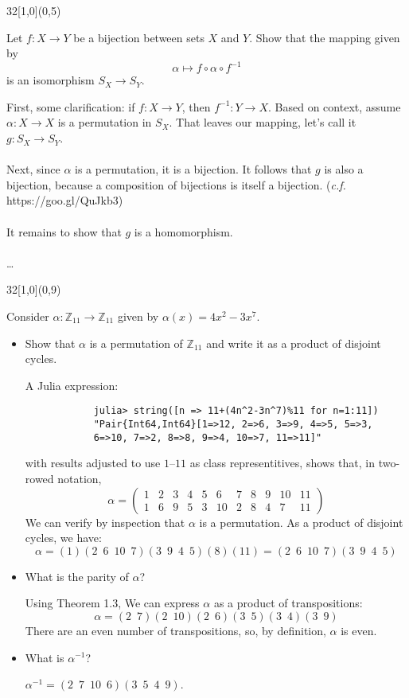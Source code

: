 \documentclass[12pt]{article}
\newcommand{\zee}{\mathbb{Z}}
\newenvironment{exercise}[2]{\begin{textblock}{32}[1,0](0,#2)\noindent#1\end{textblock}}{\vspace{1in}}
\begin{document}
\begin{exercise}{1.39}{5}
	{\noindent}Let $f : X\to Y$ be a bijection between sets $X$ and $Y$. Show that the mapping given by \[\alpha \mapsto f\circ\alpha\circ f^{-1}\] is an isomorphism $S_X\to S_Y$.
	\bigskip

	{\noindent}First, some clarification: if $f:X\to Y$, then $f^{-1}:Y\to X$. Based on context, assume $\alpha:X\to X$ is a permutation in $S_X$.
	That leaves our mapping, let's call it $g:S_X\to S_Y$.\\
	\\
	Next, since $\alpha$ is a permutation, it is a bijection. It follows that $g$ is also a bijection, because a composition of bijections is itself a bijection. ({\small{\textit{c.f.} https://goo.gl/QuJkb3}})\\
	\\
	It remains to show that $g$ is a homomorphism.\\
	\\
	\dots
\end{exercise}

\newpage

\begin{exercise}{1.29}{9} %
	{\noindent}Consider $\alpha: \zee_{11}\to \zee_{11}$ given by $\alpha(x)=4x^2-3x^7$.
	\begin{itemize}
		\item Show that $\alpha$ is a permutation of $\zee_{11}$ and write it as a product of disjoint cycles.
		\bigskip

		A Julia expression:
		\begin{verbatim}
			julia> string([n => 11+(4n^2-3n^7)%11 for n=1:11])
			"Pair{Int64,Int64}[1=>12, 2=>6, 3=>9, 4=>5, 5=>3,
			6=>10, 7=>2, 8=>8, 9=>4, 10=>7, 11=>11]"
		\end{verbatim}
		with results adjusted to use $1$--$11$ as class representitives, shows that, in two-rowed notation,
		\[
		\alpha = \left(
			\begin{array}{rrrrrrrrrrr}
		    1 &  2 &  3 &  4 &  5 &  6 &  7 &  8 &  9 & 10 & 11 \\
		    1 &  6 &  9 &  5 &  3 & 10 &  2 &  8 &  4 &  7 & 11
		  \end{array}
			\right)
		\]
		We can verify by inspection that $\alpha$ is a permutation. As a product of disjoint cycles, we have:
		\[ \alpha = (1)(2\enspace6\enspace10\enspace7)(3\enspace9\enspace4\enspace5)(8)(11) = (2\enspace6\enspace10\enspace7)(3\enspace9\enspace4\enspace5) \]

		\item What is the parity of $\alpha$?
		\bigskip

		Using Theorem 1.3, We can express $\alpha$ as a product of transpositions:
		\[ \alpha = (2\enspace7)(2\enspace10)(2\enspace6)(3\enspace5)(3\enspace4)(3\enspace9) \]
		There are an even number of transpositions, so, by definition, $\alpha$ is even.

		\item What is $\alpha^{-1}$?
		\bigskip

		$\alpha^{-1}=(2\enspace7\enspace10\enspace6)(3\enspace5\enspace4\enspace9)$.
	\end{itemize}
\end{exercise}
\end{document}
